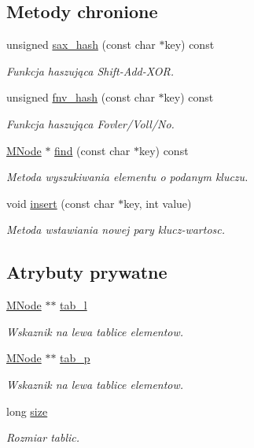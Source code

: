 \subsection*{Metody chronione}
\begin{DoxyCompactItemize}
\item 
unsigned \hyperlink{class_mieszajaca_a4508ea747690242d296d5095ccd6e2ec}{sax\-\_\-hash} (const char $\ast$key) const 
\begin{DoxyCompactList}\small\item\em Funkcja haszująca Shift-\/\-Add-\/\-X\-O\-R. \end{DoxyCompactList}\item 
unsigned \hyperlink{class_mieszajaca_a5367ffb855dcf48ed51deaab30896249}{fnv\-\_\-hash} (const char $\ast$key) const 
\begin{DoxyCompactList}\small\item\em Funkcja haszująca Fovler/\-Voll/\-No. \end{DoxyCompactList}\item 
\hyperlink{struct_m_node}{M\-Node} $\ast$ \hyperlink{class_mieszajaca_aade3fc649e04b21a9497d8d3b6939082}{find} (const char $\ast$key) const 
\begin{DoxyCompactList}\small\item\em Metoda wyszukiwania elementu o podanym kluczu. \end{DoxyCompactList}\item 
void \hyperlink{class_mieszajaca_a6c58c6edcfac89082e7d49538c8e5c74}{insert} (const char $\ast$key, int value)
\begin{DoxyCompactList}\small\item\em Metoda wstawiania nowej pary klucz-\/wartosc. \end{DoxyCompactList}\end{DoxyCompactItemize}
\subsection*{Atrybuty prywatne}
\begin{DoxyCompactItemize}
\item 
\hyperlink{struct_m_node}{M\-Node} $\ast$$\ast$ \hyperlink{class_mieszajaca_adb0f4884ed63b184cf0bd63e757490cd}{tab\-\_\-l}
\begin{DoxyCompactList}\small\item\em Wskaznik na lewa tablice elementow. \end{DoxyCompactList}\item 
\hyperlink{struct_m_node}{M\-Node} $\ast$$\ast$ \hyperlink{class_mieszajaca_a37e86d776d7eeef64b36f04e91b44a4c}{tab\-\_\-p}
\begin{DoxyCompactList}\small\item\em Wskaznik na lewa tablice elementow. \end{DoxyCompactList}\item 
long \hyperlink{class_mieszajaca_a6521d97bf16d4fd92d147aafd2a56e3f}{size}
\begin{DoxyCompactList}\small\item\em Rozmiar tablic. \end{DoxyCompactList}\end{DoxyCompactItemize}
